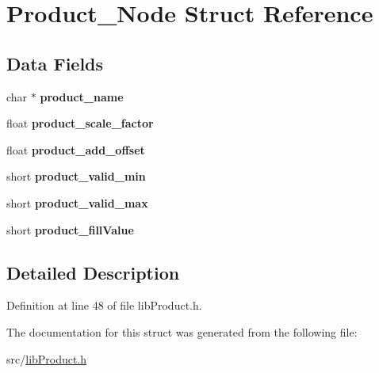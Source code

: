 \hypertarget{structProduct__Node}{\section{Product\-\_\-\-Node Struct Reference}
\label{structProduct__Node}
}
\subsection*{Data Fields}
\begin{DoxyCompactItemize}
\item 
\hypertarget{structProduct__Node_a5e2e88b162b3acc5745db0d534e9b762}{char $\ast$ {\bfseries product\-\_\-name}}\label{structProduct__Node_a5e2e88b162b3acc5745db0d534e9b762}

\item 
\hypertarget{structProduct__Node_ad3724e91d1b427b5e1859ca3947d0831}{float {\bfseries product\-\_\-scale\-\_\-factor}}\label{structProduct__Node_ad3724e91d1b427b5e1859ca3947d0831}

\item 
\hypertarget{structProduct__Node_a305c37e6c78a981f26c305f57975f4ab}{float {\bfseries product\-\_\-add\-\_\-offset}}\label{structProduct__Node_a305c37e6c78a981f26c305f57975f4ab}

\item 
\hypertarget{structProduct__Node_a5152eeed337daa783180765029f52fb9}{short {\bfseries product\-\_\-valid\-\_\-min}}\label{structProduct__Node_a5152eeed337daa783180765029f52fb9}

\item 
\hypertarget{structProduct__Node_ad60c20c6540b246d0ed992c1c7bc5c18}{short {\bfseries product\-\_\-valid\-\_\-max}}\label{structProduct__Node_ad60c20c6540b246d0ed992c1c7bc5c18}

\item 
\hypertarget{structProduct__Node_a8e4c5955bbd8cd6c6b2ce0cde9d6049f}{short {\bfseries product\-\_\-fill\-Value}}\label{structProduct__Node_a8e4c5955bbd8cd6c6b2ce0cde9d6049f}

\end{DoxyCompactItemize}


\subsection{Detailed Description}


Definition at line 48 of file lib\-Product.\-h.



The documentation for this struct was generated from the following file\-:\begin{DoxyCompactItemize}
\item 
src/\hyperlink{libProduct_8h}{lib\-Product.\-h}\end{DoxyCompactItemize}
